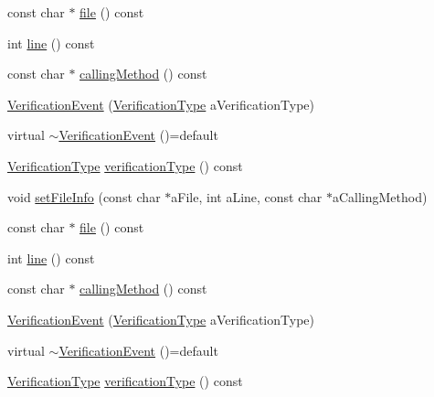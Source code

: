 \begin{DoxyCompactItemize}
\item 
const char $\ast$ \mbox{\hyperlink{structfakeit_1_1VerificationEvent_ac5e560840147ea9e20e7e802470f4d8a}{file}} () const
\item 
int \mbox{\hyperlink{structfakeit_1_1VerificationEvent_a3069b93e69102a34fca21178e931e789}{line}} () const
\item 
const char $\ast$ \mbox{\hyperlink{structfakeit_1_1VerificationEvent_a13a854b648de4ed0a11d9f1bd3d22da5}{calling\+Method}} () const
\item 
\mbox{\hyperlink{structfakeit_1_1VerificationEvent_afc2366f1ae4d03ec60cc2a2253a79728}{Verification\+Event}} (\mbox{\hyperlink{namespacefakeit_a9df22520dd60badb149c1d1d2518b253}{Verification\+Type}} a\+Verification\+Type)
\item 
virtual \mbox{\hyperlink{structfakeit_1_1VerificationEvent_a5bcca5502a6be4d65db30c1927652a77}{$\sim$\+Verification\+Event}} ()=default
\item 
\mbox{\hyperlink{namespacefakeit_a9df22520dd60badb149c1d1d2518b253}{Verification\+Type}} \mbox{\hyperlink{structfakeit_1_1VerificationEvent_a8b06372b0691ff1f6f2c4f59f5b05922}{verification\+Type}} () const
\item 
void \mbox{\hyperlink{structfakeit_1_1VerificationEvent_a6199b34d65e06976395f606f0c92f361}{set\+File\+Info}} (const char $\ast$a\+File, int a\+Line, const char $\ast$a\+Calling\+Method)
\item 
const char $\ast$ \mbox{\hyperlink{structfakeit_1_1VerificationEvent_ac5e560840147ea9e20e7e802470f4d8a}{file}} () const
\item 
int \mbox{\hyperlink{structfakeit_1_1VerificationEvent_a3069b93e69102a34fca21178e931e789}{line}} () const
\item 
const char $\ast$ \mbox{\hyperlink{structfakeit_1_1VerificationEvent_a13a854b648de4ed0a11d9f1bd3d22da5}{calling\+Method}} () const
\item 
\mbox{\hyperlink{structfakeit_1_1VerificationEvent_afc2366f1ae4d03ec60cc2a2253a79728}{Verification\+Event}} (\mbox{\hyperlink{namespacefakeit_a9df22520dd60badb149c1d1d2518b253}{Verification\+Type}} a\+Verification\+Type)
\item 
virtual \mbox{\hyperlink{structfakeit_1_1VerificationEvent_a5bcca5502a6be4d65db30c1927652a77}{$\sim$\+Verification\+Event}} ()=default
\item 
\mbox{\hyperlink{namespacefakeit_a9df22520dd60badb149c1d1d2518b253}{Verification\+Type}} \mbox{\hyperlink{structfakeit_1_1VerificationEvent_a8b06372b0691ff1f6f2c4f59f5b05922}{verification\+Type}} () const

\end{DoxyCompactItemize}
